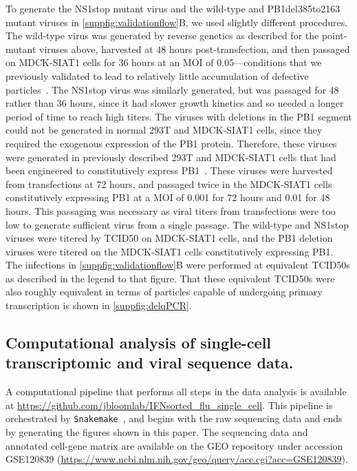 \documentclass[]{asm-article}
\newcommand{\SUPPFIG}[1]{\autoref{suppfig:#1}}
\begin{document}
To generate the NS1stop mutant virus and the wild-type and PB1del385to2163 mutant viruses in \SUPPFIG{validationflow}B, we used slightly different procedures.
The wild-type virus was generated by reverse genetics as described for the point-mutant viruses above, harvested at 48 hours post-transfection, and then passaged on MDCK-SIAT1 cells for 36 hours at an MOI of 0.05---conditions that we previously validated to lead to relatively little accumulation of defective particles~\cite{russell2018extreme}.
The NS1stop virus was similarly generated, but was passaged for 48 rather than 36 hours, since it had slower growth kinetics and so needed a longer period of time to reach high titers.
The viruses with deletions in the PB1 segment could not be generated in normal 293T and MDCK-SIAT1 cells, since they required the exogenous expression of the PB1 protein.
Therefore, these viruses were generated in previously described 293T and MDCK-SIAT1 cells that had been engineered to constitutively express PB1~\cite{bloom2010permissive}.
These viruses were harvested from transfections at 72 hours, and passaged twice in the MDCK-SIAT1 cells constitutively expressing PB1 at a MOI of 0.001 for 72 hours and 0.01 for 48 hours. 
This passaging was necessary as viral titers from transfections were too low to generate sufficient virus from a single passage.
The wild-type and NS1stop viruses were titered by TCID50 on MDCK-SIAT1 cells, and the PB1 deletion viruses were titered on the MDCK-SIAT1 cells constitutively expressing PB1.
The infections in \SUPPFIG{validationflow}B were performed at equivalent TCID50s as described in the legend to that figure.
That these equivalent TCID50s were also roughly equivalent in terms of particles capable of undergoing primary transcription is shown in \SUPPFIG{delqPCR}.

\subsection{Computational analysis of single-cell transcriptomic and viral sequence data.}
A computational pipeline that performs all steps in the data analysis is available at \url{https://github.com/jbloomlab/IFNsorted_flu_single_cell}. 
This pipeline is orchestrated by \texttt{Snakemake}~\cite{koster2012snakemake}, and begins with the raw sequencing data and ends by generating the figures shown in this paper.
The sequencing data and annotated cell-gene matrix are available on the GEO repository under accession GSE120839 (\url{https://www.ncbi.nlm.nih.gov/geo/query/acc.cgi?acc=GSE120839}).
\end{document}
